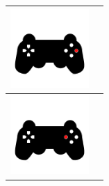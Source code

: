 \begin{table}[H]
\begin{center}
\begin{tabular}{|p{3cm}|p{8cm}|}
      \hline
       \includegraphics[width=3cm]{../imagenes/pad-6.png} & \vspace*{-.8in}{Sin función.} \\
      \hline
      \includegraphics[width=3cm]{../imagenes/pad-8.png} & \vspace*{-.8in}{Disminuir velocidad. La velocidad de movimiento del vehículo disminuye.} \\
      \hline
    \end{tabular}
  \end{center}
\end{table}

